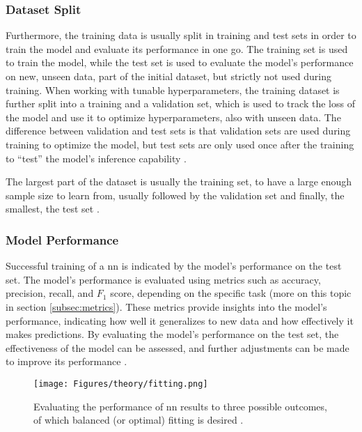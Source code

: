 \subsubsection*{Dataset Split}

Furthermore, the training data is usually split in training and test sets in order to train the model and evaluate its performance in one go. The training set is used to train the model, while the test set is used to evaluate the model's performance on new, unseen data, part of the initial dataset, but strictly not used during training. When working with tunable hyperparameters, the training dataset is further split into a training and a validation set, which is used to track the loss of the model and use it to optimize hyperparameters, also with unseen data. The difference between validation and test sets is that validation sets are used during training to optimize the model, but test sets are only used once after the training to \enquote{test} the model's inference capability \autocite{Alzubaidi.Zhang.ea2021,Zhang.Lipton.ea2023}.

The largest part of the dataset is usually the training set, to have a large enough sample size to learn from, usually followed by the validation set and finally, the smallest, the test set \autocite{Szeliski2022}.

\subsubsection*{Model Performance}

Successful training of a \gls{nn} is indicated by the model's performance on the test set. The model's performance is evaluated using metrics such as accuracy, precision, recall, and \( F_{1} \) score, depending on the specific task (more on this topic in section \ref{subsec:metrics}). These metrics provide insights into the model's performance, indicating how well it generalizes to new data and how effectively it makes predictions. By evaluating the model's performance on the test set, the effectiveness of the model can be assessed, and further adjustments can be made to improve its performance \autocite{Bernard2021,Szeliski2022,Zhang.Lipton.ea2023}.

\begin{figure}[htbp]
    \centering
    \texttt{[image: Figures/theory/fitting.png]}
    \caption[Concept of Over-, Under-, and Optimal Fitting of ]{Evaluating the performance of \gls{nn} results to three possible outcomes, of which balanced (or optimal) fitting is desired \autocite{Alzubaidi.Zhang.ea2021}.}
    \label{fig:fitting}
\end{figure} 

